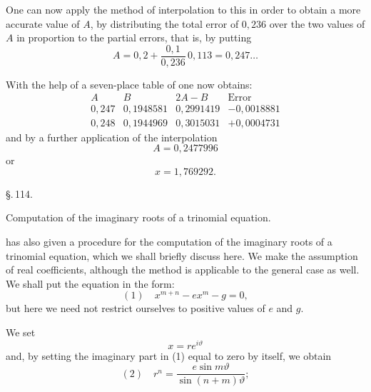 
One can now apply the method of interpolation to this in order to obtain a more accurate value of $A$, by distributing the total error of $0{,}236$ over the two values of $A$ in proportion to the partial errors, that is, by putting
\[
A = 0{,}2 + \frac{0{,}1}{0{,}236}\,0{,}113 = 0{,}247\ldots
\]

With the help of a seven-place table of  one now obtains:
\[
\begin{array}{c|c|c|c}
A & B & 2A - B & \text{Error} \\
\hline
0{,}247 & 0{,}1948581 & 0{,}2991419 & -0{,}0018881 \\
0{,}248 & 0{,}1944969 & 0{,}3015031 & +0{,}0004731
\end{array}
\]
and by a further application of the interpolation
\[
A = 0{,}2477996
\]
or %
\[
x = 1{,}769292.
\]

\begin{center}
\S.\,114.

Computation of the imaginary roots of a trinomial equation.
\end{center}

 has also given a procedure for the computation of the imaginary roots of a trinomial equation, which we shall briefly discuss here. We make the assumption of real coefficients, although the method is applicable to the general case as well. We shall put the equation in the form:
\[
(1)\quad x^{m+n} - ex^m - g = 0,
\]
but here we need not restrict ourselves to positive values of $e$ and $g$.

We set
\[
x = re^{i\vartheta}
\]
and, by setting the imaginary part in (1) equal to zero by itself, we obtain
\[
(2)\quad r^n = \frac{e\sin m\vartheta}{\sin(n+m)\vartheta};
\]
